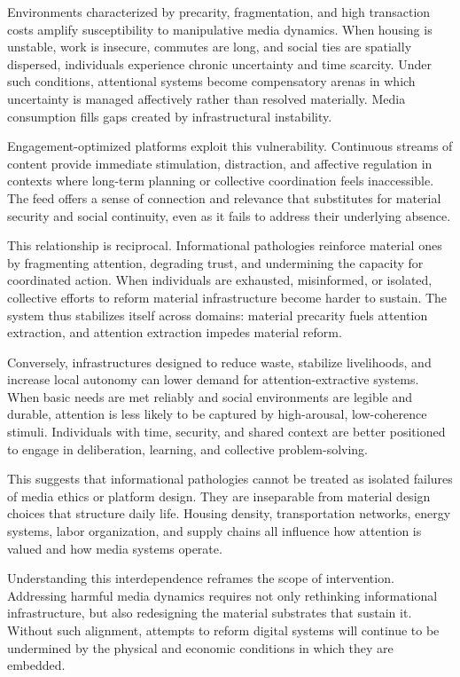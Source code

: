 \documentclass[12pt]{article}
\begin{document}
Environments characterized by precarity, fragmentation, and high transaction costs amplify susceptibility to manipulative media dynamics. When housing is unstable, work is insecure, commutes are long, and social ties are spatially dispersed, individuals experience chronic uncertainty and time scarcity. Under such conditions, attentional systems become compensatory arenas in which uncertainty is managed affectively rather than resolved materially. Media consumption fills gaps created by infrastructural instability.

Engagement-optimized platforms exploit this vulnerability. Continuous streams of content provide immediate stimulation, distraction, and affective regulation in contexts where long-term planning or collective coordination feels inaccessible. The feed offers a sense of connection and relevance that substitutes for material security and social continuity, even as it fails to address their underlying absence.

This relationship is reciprocal. Informational pathologies reinforce material ones by fragmenting attention, degrading trust, and undermining the capacity for coordinated action. When individuals are exhausted, misinformed, or isolated, collective efforts to reform material infrastructure become harder to sustain. The system thus stabilizes itself across domains: material precarity fuels attention extraction, and attention extraction impedes material reform.

Conversely, infrastructures designed to reduce waste, stabilize livelihoods, and increase local autonomy can lower demand for attention-extractive systems. When basic needs are met reliably and social environments are legible and durable, attention is less likely to be captured by high-arousal, low-coherence stimuli. Individuals with time, security, and shared context are better positioned to engage in deliberation, learning, and collective problem-solving.

This suggests that informational pathologies cannot be treated as isolated failures of media ethics or platform design. They are inseparable from material design choices that structure daily life. Housing density, transportation networks, energy systems, labor organization, and supply chains all influence how attention is valued and how media systems operate.

Understanding this interdependence reframes the scope of intervention. Addressing harmful media dynamics requires not only rethinking informational infrastructure, but also redesigning the material substrates that sustain it. Without such alignment, attempts to reform digital systems will continue to be undermined by the physical and economic conditions in which they are embedded.
\end{document}
